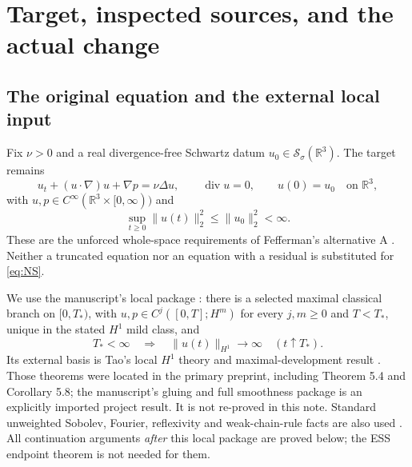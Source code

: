 \documentclass[11pt,a4paper]{article}
\theoremstyle{definition}\newtheorem{definition}[theorem]{Definition}
\theoremstyle{remark}\newtheorem{remark}[theorem]{Remark}
\newcommand{\R}{\mathbb R}
\newcommand{\norm}[1]{\lVert #1\rVert}
\newcommand{\diver}{\operatorname{div}}
\newcommand{\Sch}{\mathcal S_\sigma(\R^3)}
\numberwithin{equation}{section}
\begin{document}
\section{Target, inspected sources, and the actual change}
\label{sec:scope}
\subsection{The original equation and the external local input}
Fix $\nu>0$ and a real divergence-free Schwartz datum $u_0\in\Sch$. The target remains
\begin{equation}\label{eq:NS}
 u_t+(u\cdot\nabla)u+\nabla p=\nu\Delta u,
 \qquad\diver u=0,\qquad u(0)=u_0\quad\text{on }\R^3,
\end{equation}
with $u,p\in C^\infty(\R^3\times[0,\infty))$ and
\begin{equation}\label{eq:energytarget}
 \sup_{t\ge0}\norm{u(t)}_2^2\le\norm{u_0}_2^2<\infty.
\end{equation}
These are the unforced whole-space requirements of Fefferman's alternative A \cite{Clay}. Neither a truncated equation nor an equation with a residual is substituted for \eqref{eq:NS}.

We use the manuscript's local package \cite{Paper}: there is a selected maximal classical branch on $[0,T_*)$, with $u,p\in C^j([0,T];H^m)$ for every $j,m\ge0$ and $T<T_*$, unique in the stated $H^1$ mild class, and
\begin{equation}\label{eq:H1alternative}
 T_*<\infty\quad\Longrightarrow\quad
 \norm{u(t)}_{H^1}\longrightarrow\infty\quad(t\uparrow T_*).
\end{equation}
Its external basis is Tao's local $H^1$ theory and maximal-development result \cite{Tao}. Those theorems were located in the primary preprint, including Theorem 5.4 and Corollary 5.8; the manuscript's gluing and full smoothness package is an explicitly imported project result. It is not re-proved in this note. Standard unweighted Sobolev, Fourier, reflexivity and weak-chain-rule facts are also used \cite{Stein,Brezis}. All continuation arguments \emph{after} this local package are proved below; the ESS endpoint theorem is not needed for them.
\end{document}
